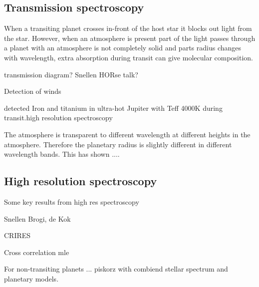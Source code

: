 


\subsection{Transmission spectroscopy}
When a transiting planet crosses in-front of the host star it blocks out light from the star. However, when an atmosphere is present part of the light passes through  a planet with an atmosphere is not completely solid and parts
radius changes with wavelength, extra absorption during transit can give molecular composition.


transmission diagram? Snellen HORse talk?

Detection of winds



\citep{hoeijmakers_atomic_2018} detected Iron and titanium in ultra-hot Jupiter with Teff 4000K during transit.high resolution spectroscopy


The atmosphere is transparent to different wavelength at different heights in the atmosphere. Therefore the planetary radius is slightly different in different wavelength bands. This has shown ....



\subsection{High resolution spectroscopy}
Some key results from high res spectroscopy

Snellen  Brogi, de Kok

CRIRES  

Cross correlation mle  \citet{piskorz_evidence_2016}


For non-transiting planets ...  piskorz   with combiend stellar spectrum and planetary models.

